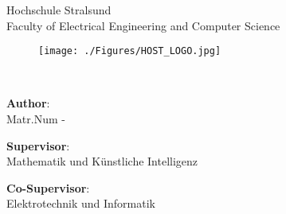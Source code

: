 \makeatletter
\begin{titlepage}
    \begin{center}
        \vspace*{1cm}
        \small
        Hochschule Stralsund\\
        Faculty of Electrical Engineering and Computer Science\\
        \begin{figure}[htbp]
             \centering
             \texttt{[image: ./Figures/HOST\_LOGO.jpg]}
        \end{figure} 
        \vspace{0.1cm}
        \large{\thesistype}\\
        \vspace{0.75cm}
        \huge
        \textbf{\@title}
        \vspace{2cm}
        
        \large
        \textbf{Author}: \thesisauthor{} \\
        \vspace{0.1cm}
        \small Matr.Num - {\studentID}\\
        \vspace{0.25cm}
        
        \large
        \textbf{Supervisor}: \supervisor{} \\
        \vspace{0.1cm}
        \small Mathematik und Künstliche Intelligenz\\
        \vspace{0.25cm}
        
        \large
        \textbf{Co-Supervisor}: \cosupervisor{} \\ 
        \vspace{0.1cm}
        \small Elektrotechnik und Informatik\\
        \vspace{0.25cm}
        
        \vspace{1cm}
        

        \vspace{1cm}
        \@date

    \end{center}
\end{titlepage}
\makeatother